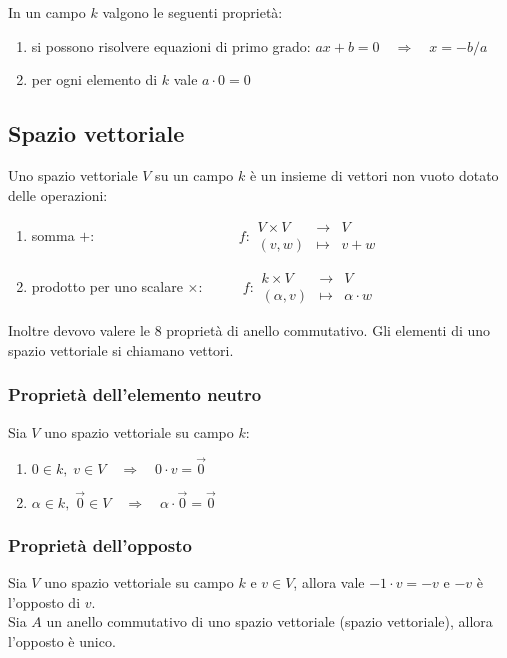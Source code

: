 \documentclass[a4paper]{article}
\begin{document}
In un campo \(k\) valgono le seguenti proprietà:
\begin{enumerate}[topsep=3pt, itemsep=0pt]
	\item si possono risolvere equazioni di primo grado: \(ax + b = 0 \quad \Rightarrow \quad x = -b/a\)
	\item per ogni elemento di \(k\) vale \(a \cdot 0 = 0\)
\end{enumerate}

\subsection{Spazio vettoriale}
Uno spazio vettoriale \(V\) su un campo \(k\) è un insieme di vettori non vuoto dotato delle operazioni:
\begin{enumerate}
	\item somma \(+\): \(\qquad \qquad \qquad \qquad \qquad f : \begin{matrix}
		V \times V &\to &V \\
		(v, w) &\mapsto &v + w
	\end{matrix}\)
	\item prodotto per uno scalare \(\times\): \(\qquad \;\; f : \begin{matrix}
		k \times V &\to &V \\
		(\alpha, v) &\mapsto &\alpha \cdot w
	\end{matrix}\)
\end{enumerate}
Inoltre devovo valere le 8 proprietà di anello commutativo.
Gli elementi di uno spazio vettoriale si chiamano vettori.

\subsubsection*{Proprietà dell'elemento neutro}
Sia \(V\) uno spazio vettoriale su campo \(k\):
\begin{enumerate}[topsep=3pt, itemsep=0pt]
	\item \(0 \in k, \; v \in V \quad \Rightarrow \quad 0 \cdot v = \vec{0}\)
	\item \(\alpha \in k, \; \vec{0} \in V \quad \Rightarrow \quad \alpha \cdot \vec{0} = \vec{0}\)
\end{enumerate}

\subsubsection*{Proprietà dell'opposto}
Sia \(V\) uno spazio vettoriale su campo \(k\) e \(v \in V\), allora vale \(-1 \cdot v = -v\) e \(-v\) è l'opposto di \(v\). \\
Sia \(A\) un anello commutativo di uno spazio vettoriale (spazio vettoriale), allora l'opposto è unico.
\end{document}
